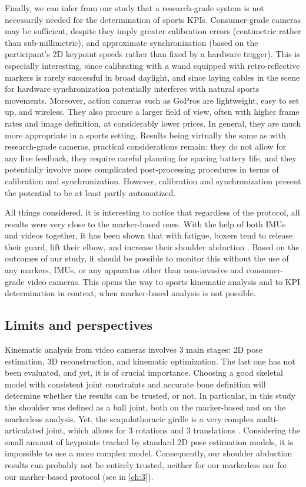 Finally, we can infer from our study that a research-grade system is not necessarily needed for the determination of sports KPIs. Consumer-grade cameras may be sufficient, despite they imply greater calibration errors (centimetric rather than sub-millimetric), and approximate synchronization (based on the participant's 2D keypoint speeds rather than fixed by a hardware trigger). This is especially interesting, since calibrating with a wand equipped with retro-reflective markers is rarely successful in broad daylight, and since laying cables in the scene for hardware synchronization potentially interferes with natural sports movements. Moreover, action cameras such as GoPros are lightweight, easy to set up, and wireless. They also procure a larger field of view, often with higher frame rates and image definition, at considerably lower prices. In general, they are much more appropriate in a sports setting. Results being virtually the same as with research-grade cameras, practical considerations remain: they do not allow for any live feedback, they require careful planning for sparing battery life, and they potentially involve more complicated post-processing procedures in terms of calibration and synchronization. However, calibration and synchronization present the potential to be at least partly automatized.

All things considered, it is interesting to notice that regardless of the protocol, all results were very close to the marker-based ones. With the help of both IMUs and videos together, it has been shown that with fatigue, boxers tend to release their guard, lift their elbow, and increase their shoulder abduction \cite{Haralabidis2020}. Based on the outcomes of our study, it should be possible to monitor this without the use of any markers, IMUs, or any apparatus other than non-invasive and consumer-grade video cameras. This opens the way to sports kinematic analysis and to KPI determination in context, when marker-based analysis is not possible. 


\subsection{Limits and perspectives}

Kinematic analysis from video cameras involves 3 main stages: 2D pose estimation, 3D reconstruction, and kinematic optimization. The last one has not been evaluated, and yet, it is of crucial importance. Choosing a good skeletal model with consistent joint constraints and accurate bone definition will determine whether the results can be trusted, or not. In particular, in this study the shoulder was defined as a ball joint, both on the marker-based and on the markerless analysis. Yet, the scapulothoracic girdle is a very complex multi-articulated joint, which allows for 3 rotations and 3 translations \cite{Seth2016}. Considering the small amount of keypoints tracked by standard 2D pose estimation models, it is impossible to use a more complex model. Consequently, our shoulder abduction results can probably not be entirely trusted, neither for our markerless nor for our marker-based protocol (see  in \autoref{ch:3}).

